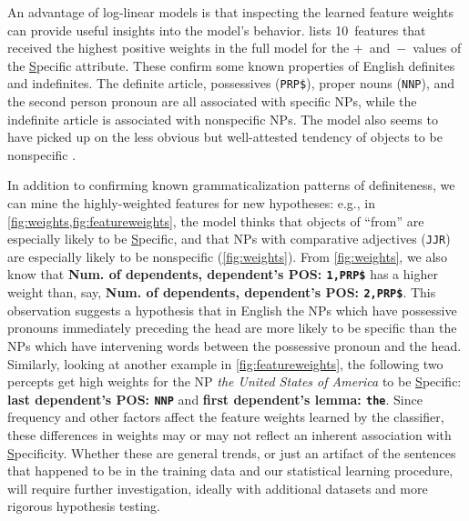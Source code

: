 \documentclass[11pt,letterpaper]{article}
\newcommand{\percept}[1]{{\sffamily\bfseries #1}}
\begin{document}
An advantage of log-linear models is that inspecting the learned feature weights can provide useful insights into the model's behavior.
 lists 10~features that received the highest positive weights in the full model 
for the \mbox{$+$ and $-$ values} of the \uline{S}pecific attribute. 
These confirm some known properties of English definites and indefinites. 
The definite article, possessives (\texttt{PRP\$}), proper nouns (\texttt{NNP}), and the second person pronoun 
are all associated with {specific} NPs, while the indefinite article is associated with nonspecific NPs.
The model also seems to have picked up on the less obvious but well-attested tendency 
of objects to be nonspecific \citep{aissen-03}.
 

In addition to confirming known grammaticalization patterns of definiteness, 
we can mine the highly-weighted features for new hypotheses: 
e.g., in \cref{fig:weights,fig:featureweights}, the model thinks that objects of ``from'' are especially likely to be \uline{S}pecific, and  that NPs with comparative adjectives (\texttt{JJR}) are especially likely to be nonspecific (\cref{fig:weights}). 
From \cref{fig:weights}, we also know that \percept{Num. of dependents, dependent's POS: \texttt{1,PRP\$}} has a higher weight than, 
say, \percept{Num. of dependents, dependent's POS: \texttt{2,PRP\$}}. 
This observation suggests a hypothesis that in English the NPs which have possessive pronouns immediately preceding the head 
are more likely to be specific than the NPs which have intervening words between the possessive pronoun and the head.
Similarly, looking at another example in \cref{fig:featureweights}, the following two percepts get high weights 
for the NP \emph{the United States of America} to be \uline{S}pecific: \percept{last dependent’s POS: \texttt{NNP}} 
and \percept{first dependent’s lemma: \texttt{the}}. 
Since frequency and other factors affect the feature weights learned by the classifier,
these differences in weights may or may not reflect an inherent association with \uline{S}pecificity.
Whether these are general trends, or just an artifact of the sentences that happened to be in the training data and our statistical learning procedure, 
will require further investigation, ideally with additional datasets and more rigorous hypothesis testing.
\end{document}

